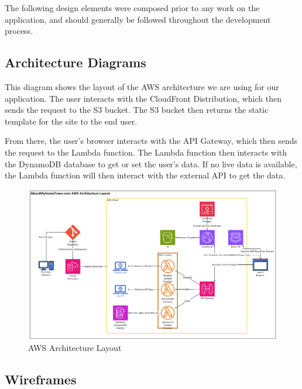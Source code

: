 \documentclass[12pt]{article}
\begin{document}
The following design elements were composed prior to any work on the application, and should generally be followed throughout the development process.

\subsection{Architecture Diagrams}

This diagram shows the layout of the AWS architecture we are using for our application. The user interacts with the CloudFront Distribution, which then sends the request to the S3 bucket. The S3 bucket then returns the static template for the site to the end user.

From there, the user's browser interacts with the API Gateway, which then sends the request to the Lambda function. The Lambda function then interacts with the DynamoDB database to get or set the user's data. If no live data is available, the Lambda function will then interact with the external API to get the data.

\begin{figure}[htbp]
    \centering
    \includegraphics[width=\textwidth]{images/aws_architecture_layout.png}
    \caption{AWS Architecture Layout}
    \label{fig:architecture}
\end{figure}

\subsection{Wireframes}
\end{document}
